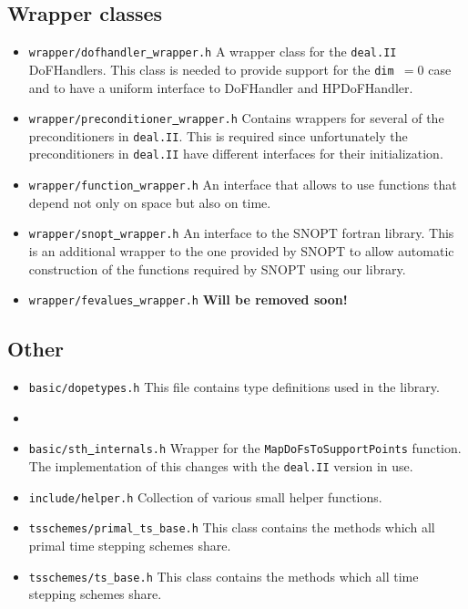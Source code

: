 \subsection{Wrapper classes}
\begin{itemize}
  \item \texttt{wrapper/dofhandler\underline{ }wrapper.h} A wrapper class for the \texttt{deal.II} DoFHandlers. This 
    class is needed to provide support for the \texttt{dim $= 0$} case and to have a uniform interface to 
    DoFHandler and HPDoFHandler.
  \item \texttt{wrapper/preconditioner\underline{ }wrapper.h} Contains wrappers for several of the preconditioners
    in \texttt{deal.II}. This is required since unfortunately the preconditioners in \texttt{deal.II} have different
    interfaces for their initialization.
  \item \texttt{wrapper/function\underline{ }wrapper.h} An interface that allows to use functions that depend 
    not only on space but also on time.
  \item \texttt{wrapper/snopt\underline{ }wrapper.h} An interface to the SNOPT fortran library. This is an additional
    wrapper to the one provided by SNOPT to allow automatic construction of the functions required 
    by SNOPT using our library.
  \item \texttt{wrapper/fevalues\underline{ }wrapper.h} {\bf Will be removed soon!}
\end{itemize}

\subsection{Other}
\begin{itemize}
  \item \texttt{basic/dopetypes.h} This file contains type definitions used in the library. 
\item \item \texttt{basic/sth\underline{ }internals.h} Wrapper for the \texttt{MapDoFsToSupportPoints} function. The implementation of this changes with the \texttt{deal.II} version in use.
\item \texttt{include/helper.h} Collection of various small helper functions.
\item \texttt{tsschemes/primal\_ts\_base.h}  This class contains the methods which all primal time stepping schemes share.
\item \texttt{tsschemes/ts\_base.h}  This class contains the methods which all time stepping schemes share.
\end{itemize}
